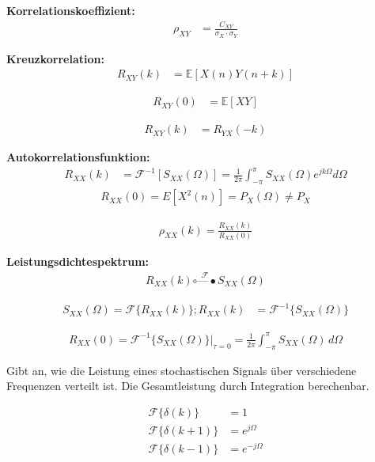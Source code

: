\textbf{Korrelationskoeffizient:}
\begin{align}
\rho_{XY} &= \frac{C_{XY}}{\sigma_X \cdot \sigma_Y}
\end{align}

\textbf{Kreuzkorrelation:}
\begin{align}
R_{XY}(k) &= \mathbb{E}[X(n)Y(n+k)]
\end{align}

\begin{align}
R_{XY}(0) &= \mathbb{E}[XY]
\end{align}

\begin{align}
R_{XY}(k) &= R_{YX}(-k)
\end{align}

\textbf{Autokorrelationsfunktion:}
\begin{align}
R_{XX}(k) &= \mathcal{F}^{-1}[S_{XX}(\Omega)] = \frac{1}{2\pi} \int_{-\pi}^{\pi} S_{XX}(\Omega) e^{j k \Omega} d\Omega
\end{align}
\begin{align}
R_{XX}(0) =E[X^2(n)] = P_X(\Omega) \neq P_X
\end{align}

\begin{align}
\rho_{XX}(k) = \frac{R_{XX}(k)}{R_{XX}(0)}
\end{align}

\textbf{Leistungsdichtespektrum:}
\begin{align}
R_{XX}(k) \overset{\mathcal{F}}{\circ\mbox{---}\bullet} S_{XX}(\Omega)
\end{align}

\begin{align}
S_{XX}(\Omega) = \mathcal{F}\{R_{XX}(k)\}; R_{XX}(k) &=  \mathcal{F}^{-1}\{S_{XX}(\Omega)\}
\end{align}

\begin{align}
R_{XX}(0) = \mathcal{F}^{-1}\{S_{XX}(\Omega)\}|_{\tau=0} = \frac{1}{2\pi} \int_{-\pi}^{\pi} S_{XX}(\Omega) \, d\Omega
\end{align}

Gibt an, wie die Leistung eines stochastischen Signals über verschiedene Frequenzen verteilt ist. Die Gesamtleistung durch Integration berechenbar.

\begin{align}
\mathcal{F}\{\delta(k)\} &= 1 \\
\mathcal{F}\{\delta(k+1)\} &= e^{j\Omega} \\
\mathcal{F}\{\delta(k-1)\} &= e^{-j\Omega}
\end{align}

